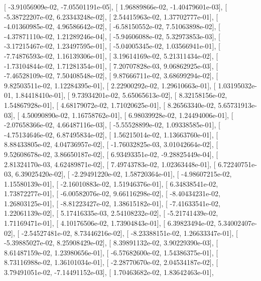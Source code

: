 \documentclass{article}
\begin{document}
       [ -3.91056909e-02,  -7.05501191e-05],
       [  1.96889866e-02,  -1.40479601e-03],
       [ -5.38722207e-02,   6.23343248e-02],
       [  2.54415963e-02,   1.37702777e-01],
       [ -4.01360985e-02,   4.96586642e-02],
       [ -6.58150552e-02,   7.51063898e-02],
       [ -4.37871110e-02,   1.21289246e-04],
       [ -5.94606088e-02,   5.32973853e-03],
       [ -3.17215467e-02,   1.23497595e-01],
       [ -5.04005345e-02,   1.03566941e-01],
       [ -7.74876593e-02,   1.16139306e-01],
       [  3.19614169e-02,   5.21311434e-02],
       [ -1.73104844e-02,   1.71281354e-01],
       [  7.20707828e-03,   9.06862925e-03],
       [ -7.46528109e-02,   7.50408548e-02],
       [  9.87666711e-02,   3.68699294e-02],
       [  9.82503511e-02,   1.12284395e-01],
       [  2.22900292e-02,   1.29610663e-01],
       [  1.03195032e-01,   1.84418410e-01],
       [  9.73934201e-02,   5.65065613e-02],
       [  8.32158156e-02,   1.54867928e-01],
       [  4.68179072e-02,   1.71020625e-01],
       [  8.26563340e-02,   5.65731913e-03],
       [  4.50090890e-02,   1.16758762e-01],
       [  6.98039928e-02,   1.24494006e-01],
       [ -2.07658366e-02,   4.66487116e-03],
       [ -5.55528899e-02,   1.09338585e-01],
       [ -4.75134646e-02,   6.87495834e-02],
       [  1.56215014e-02,   1.13663760e-01],
       [  8.88433805e-02,   4.04736957e-02],
       [ -1.76032825e-03,   3.01042664e-02],
       [  9.52608678e-02,   3.86650187e-02],
       [  6.93493351e-02,  -9.28825449e-04],
       [  2.81324170e-03,   4.62489871e-02],
       [  7.49743783e-02,   1.02363448e-01],
       [  6.72240751e-03,   6.39025420e-02],
       [ -2.29491220e-02,   1.58720364e-01],
       [ -4.98607215e-02,   1.15580139e-01],
       [ -2.16010883e-02,   1.51946376e-01],
       [  6.34838541e-02,   1.73872277e-01],
       [ -6.00582076e-02,   9.66116298e-02],
       [ -8.40434231e-02,   1.26803125e-01],
       [ -8.81223427e-02,   1.38615182e-01],
       [ -7.41633541e-02,   1.22061139e-02],
       [  5.17416335e-03,   2.54108232e-02],
       [ -5.21741439e-02,   1.71169471e-01],
       [  4.10176506e-02,   1.73904843e-01],
       [  6.39823494e-02,   5.34002407e-02],
       [ -2.54527481e-02,   8.73446216e-02],
       [ -8.23388151e-02,   1.26633347e-01],
       [ -5.39885027e-02,   8.25908429e-02],
       [  8.39891132e-02,   3.90229390e-03],
       [  8.61487159e-02,   1.23980656e-01],
       [ -6.57682600e-02,   1.54386375e-01],
       [  8.73116988e-02,   1.36101034e-01],
       [ -2.28770670e-02,   2.04534187e-02],
       [  3.79491051e-02,  -7.14491152e-03],
       [  1.70463682e-02,   1.83642463e-01],
\end{document}
